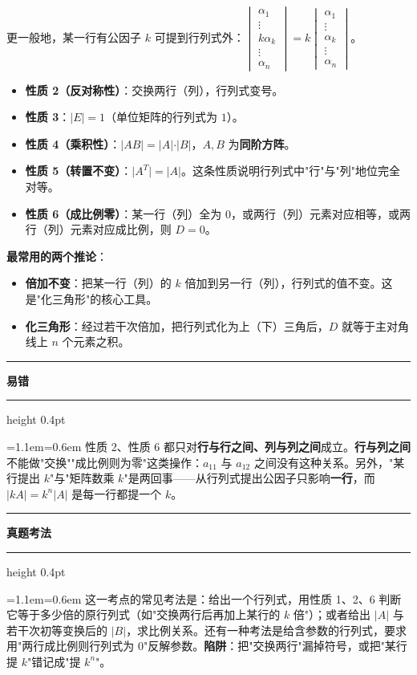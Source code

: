 \documentclass[11pt,openany,UTF8]{ctexbook}
\newcommand{\callouthead}[2]{%
  \par\addvspace{7pt}\noindent
  {\color{#1}\rule[-0.15em]{3pt}{1.05em}}\hspace{0.5em}%
  {\bfseries\color{#1}#2}\par\nobreak\vspace{-0.35em}%
  {\color{rulesep}\hrule height 0.4pt}\nobreak\vspace{0.45em}%
  \begingroup\small\setlength{\parindent}{0pt}%
  \leftskip=1.1em\rightskip=0.6em\noindent\ignorespaces}
\newcommand{\calloutend}{\par\endgroup\addvspace{7pt}}
\newenvironment{callwarn}[1]{\callouthead{warnbar}{#1}}{\calloutend}
\newenvironment{callexam}[1]{\callouthead{exambar}{#1}}{\calloutend}
\begin{document}
更一般地，某一行有公因子 $k$ 可提到行列式外：$\begin{vmatrix}\alpha_1\\\vdots\\k\alpha_k\\\vdots\\\alpha_n\end{vmatrix}=k\begin{vmatrix}\alpha_1\\\vdots\\\alpha_k\\\vdots\\\alpha_n\end{vmatrix}$。

\begin{itemize}
\item \textbf{性质 2（反对称性）}：交换两行（列），行列式变号。
\item \textbf{性质 3}：$\vert E\vert=1$（单位矩阵的行列式为 $1$）。
\item \textbf{性质 4（乘积性）}：$\vert AB\vert=\vert A\vert\cdot\vert B\vert$，$A,B$ 为\textbf{同阶方阵}。
\item \textbf{性质 5（转置不变）}：$\vert A^T\vert=\vert A\vert$。这条性质说明行列式中"行"与"列"地位完全对等。
\item \textbf{性质 6（成比例零）}：某一行（列）全为 $0$，或两行（列）元素对应相等，或两行（列）元素对应成比例，则 $D=0$。
\end{itemize}
\textbf{最常用的两个推论}：

\begin{itemize}
\item \textbf{倍加不变}：把某一行（列）的 $k$ 倍加到另一行（列），行列式的值不变。这是"化三角形"的核心工具。
\item \textbf{化三角形}：经过若干次倍加，把行列式化为上（下）三角后，$D$ 就等于主对角线上 $n$ 个元素之积。
\end{itemize}
\begin{callwarn}{易错}
性质 2、性质 6 都只对\textbf{行与行之间、列与列之间}成立。\textbf{行与列之间}不能做"交换""成比例则为零"这类操作：$a_{11}$ 与 $a_{12}$ 之间没有这种关系。另外，"某行提出 $k$"与"矩阵数乘 $k$"是两回事——从行列式提出公因子只影响\textbf{一行}，而 $\vert kA\vert=k^n\vert A\vert$ 是每一行都提一个 $k$。

\end{callwarn}

\begin{callexam}{真题考法}
这一考点的常见考法是：给出一个行列式，用性质 1、2、6 判断它等于多少倍的原行列式（如"交换两行后再加上某行的 $k$ 倍"）；或者给出 $\vert A\vert$ 与若干次初等变换后的 $\vert B\vert$，求比例关系。还有一种考法是给含参数的行列式，要求用"两行成比例则行列式为 $0$"反解参数。\textbf{陷阱}：把"交换两行"漏掉符号，或把"某行提 $k$"错记成"提 $k^n$"。

\end{callexam}
\end{document}

